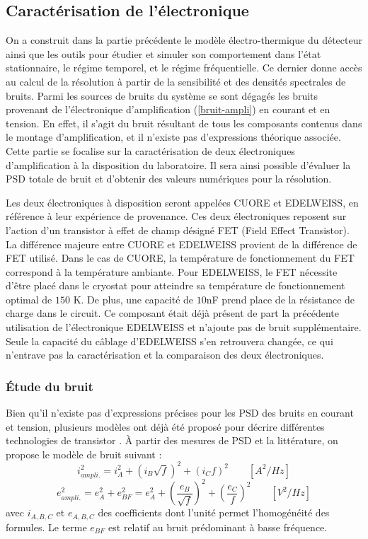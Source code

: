 \subsection{Caractérisation de l'électronique}
\label{caract}
On a construit dans la partie précédente le modèle électro-thermique du détecteur ainsi que les outils pour étudier et simuler son comportement dans l'état stationnaire, le régime temporel, et le régime fréquentielle. Ce dernier donne accès au calcul de la résolution à partir de la sensibilité et des densités spectrales de bruits. Parmi les sources de bruits du système se sont dégagés les bruits provenant de l'électronique d'amplification (\ref{bruit-ampli}) en courant et en tension. En effet, il s'agit du bruit résultant de tous les composants contenus dans le montage d'amplification, et il n'existe pas d'expressions théorique associée. Cette partie se focalise sur la caractérisation de deux électroniques d'amplification à la disposition du laboratoire. Il sera ainsi possible d'évaluer la PSD totale de bruit et d'obtenir des valeurs numériques pour la résolution.

Les deux électroniques à disposition seront appelées CUORE et EDELWEISS, en référence à leur expérience de provenance. Ces deux électroniques reposent sur l'action d'un transistor à effet de champ désigné FET (Field Effect Transistor). La différence majeure entre CUORE et EDELWEISS provient de la différence de FET utilisé. Dans le cas de CUORE, la température de fonctionnement du FET correspond à la température ambiante. Pour EDELWEISS, le FET nécessite d'être placé dans le cryostat pour atteindre sa température de fonctionnement optimal de $150$ K. De plus, une capacité de $10$nF prend place de la résistance de charge dans le circuit. Ce composant était déjà présent de part la précédente utilisation de l'électronique EDELWEISS et n'ajoute pas de bruit supplémentaire. Seule la capacité du câblage d'EDELWEISS s'en retrouvera changée, ce qui n'entrave pas la caractérisation et la comparaison des deux électroniques.

\subsubsection{Étude du bruit}

Bien qu'il n'existe pas d'expressions précises pour les PSD des bruits en courant et tension, plusieurs modèles ont déjà été proposé pour décrire différentes technologies de transistor \cite{low-noise-electronic} \cite{alex}. À partir des mesures de PSD et la littérature, on propose le modèle de bruit suivant :
\begin{equation}
\label{i-ampli}
i_{ampli.}^2 = i_A^2 + (i_B \sqrt{f})^2 + (i_C f)^2 \qquad [A^2/Hz]
\end{equation}
\begin{equation}
\label{e-ampli}
e_{ampli.}^2 = e_A^2 + e_{BF}^2 = e_A^2 + \left( \frac{e_B}{\sqrt{f}} \right)^2 +\left( \frac{e_C}{f} \right)^2 \qquad [V^2/Hz]
\end{equation}
avec $i_{A,B,C}$ et $e_{A,B,C}$ des coefficients dont l'unité permet l'homogénéité des formules. Le terme $e_{BF}$ est relatif au bruit prédominant à basse fréquence.


